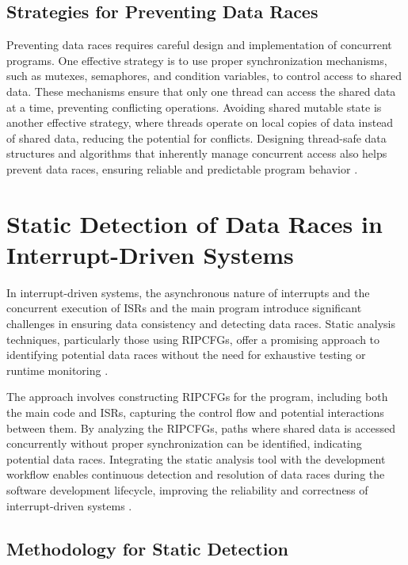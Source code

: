 \documentclass[
fancyheadings, %
%
%
]{stsreprt}
\begin{document}
{		\subsection{Strategies for Preventing Data Races}
		
		Preventing data races requires careful design and implementation of concurrent programs. One effective strategy is to use proper synchronization mechanisms, such as mutexes, semaphores, and condition variables, to control access to shared data. These mechanisms ensure that only one thread can access the shared data at a time, preventing conflicting operations. Avoiding shared mutable state is another effective strategy, where threads operate on local copies of data instead of shared data, reducing the potential for conflicts. Designing thread-safe data structures and algorithms that inherently manage concurrent access also helps prevent data races, ensuring reliable and predictable program behavior \cite{herlihy2008}.
		
		\section{Static Detection of Data Races in Interrupt-Driven Systems}
		
		In interrupt-driven systems, the asynchronous nature of interrupts and the concurrent execution of ISRs and the main program introduce significant challenges in ensuring data consistency and detecting data races. Static analysis techniques, particularly those using RIPCFGs, offer a promising approach to identifying potential data races without the need for exhaustive testing or runtime monitoring \cite{wang2020}.
		
		The approach involves constructing RIPCFGs for the program, including both the main code and ISRs, capturing the control flow and potential interactions between them. By analyzing the RIPCFGs, paths where shared data is accessed concurrently without proper synchronization can be identified, indicating potential data races. Integrating the static analysis tool with the development workflow enables continuous detection and resolution of data races during the software development lifecycle, improving the reliability and correctness of interrupt-driven systems \cite{wang2020}.
		
		\subsection{Methodology for Static Detection}
		
}
\end{document}
